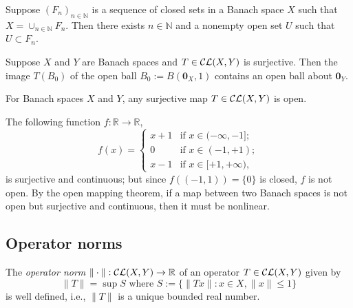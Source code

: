 \begin{thm}[Baire]
  \label{thm:Baire}
  Suppose $(F_n)_{n\in \mathbb{N}}$ is a sequence of closed sets
  in a Banach space $X$ such that $X=\cup_{n\in \mathbb{N}} F_n$.
  Then there exists $n\in \mathbb{N}$
  and a nonempty open set $U$ such that $U\subset F_n$.
\end{thm}

\begin{lem}
  \label{lem:helpForOpenMapping}
  Suppose $X$ and $Y$ are Banach spaces
  and $T\in {\cal CL}(X,Y)$ is surjective.
  Then the image $T(B_0)$ of the open ball
  $B_0:=B(\mathbf{0}_X,1)$ contains an open ball about $\mathbf{0}_Y$.
\end{lem}

\begin{thm}
  \label{thm:openMapping}
  For Banach spaces $X$ and $Y$,
  any surjective map $T\in {\cal CL}(X,Y)$ is open.
\end{thm}

\begin{exm}
  The following function $f: \mathbb{R}\rightarrow \mathbb{R}$, 
  \begin{displaymath}
    f(x) =
    \begin{cases}
      x+1 & \text{if } x\in (-\infty, -1];
      \\
      0 & \text{if } x\in (-1, +1);
      \\
      x-1 & \text{if } x\in [+1,+\infty),
    \end{cases}
  \end{displaymath}
  is surjective and continuous;
  but since $f((-1,1))=\{0\}$ is closed,
  $f$ is not open.
  By the open mapping theorem,
  if a map between two Banach spaces
  is not open but surjective and continuous, 
  then it must be nonlinear.
\end{exm}

\subsection{Operator norms}
\label{sec:operator-norms}

\begin{lem}
  \label{def:OpNormCLXY}
  The \emph{operator norm}
  $\|\cdot\|: {\cal CL}(X,Y)\rightarrow \mathbb{R}$
  of an operator $T\in {\cal CL}(X,Y)$ given by 
  \begin{equation}
    \label{eq:OpNormCLXY}
    \|T\|= \sup S \text{ where }
    S:=\bigl\{\|Tx\|: x\in X, \|x\|\le 1\bigr\} 
  \end{equation}
  is well defined, i.e., $\|T\|$ is a unique bounded real number.
\end{lem}

